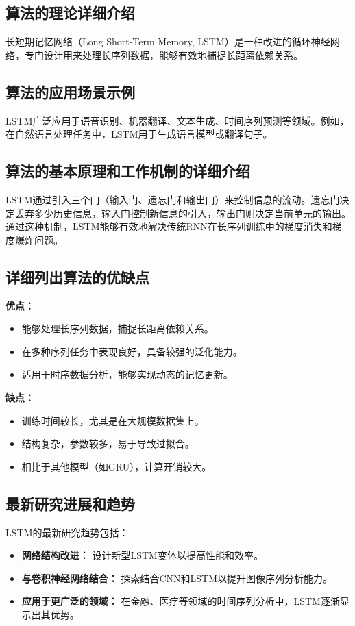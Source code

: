 \subsection*{算法的理论详细介绍}
长短期记忆网络（Long Short-Term Memory, LSTM）是一种改进的循环神经网络，专门设计用来处理长序列数据，能够有效地捕捉长距离依赖关系。

\subsection*{算法的应用场景示例}
LSTM广泛应用于语音识别、机器翻译、文本生成、时间序列预测等领域。例如，在自然语言处理任务中，LSTM用于生成语言模型或翻译句子。

\subsection*{算法的基本原理和工作机制的详细介绍}
LSTM通过引入三个门（输入门、遗忘门和输出门）来控制信息的流动。遗忘门决定丢弃多少历史信息，输入门控制新信息的引入，输出门则决定当前单元的输出。通过这种机制，LSTM能够有效地解决传统RNN在长序列训练中的梯度消失和梯度爆炸问题。

\subsection*{详细列出算法的优缺点}
\textbf{优点：}
\begin{itemize}
    \item 能够处理长序列数据，捕捉长距离依赖关系。
    \item 在多种序列任务中表现良好，具备较强的泛化能力。
    \item 适用于时序数据分析，能够实现动态的记忆更新。
\end{itemize}

\textbf{缺点：}
\begin{itemize}
    \item 训练时间较长，尤其是在大规模数据集上。
    \item 结构复杂，参数较多，易于导致过拟合。
    \item 相比于其他模型（如GRU），计算开销较大。
\end{itemize}

\subsection*{最新研究进展和趋势}
LSTM的最新研究趋势包括：
\begin{itemize}
    \item \textbf{网络结构改进：} 设计新型LSTM变体以提高性能和效率。
    \item \textbf{与卷积神经网络结合：} 探索结合CNN和LSTM以提升图像序列分析能力。
    \item \textbf{应用于更广泛的领域：} 在金融、医疗等领域的时间序列分析中，LSTM逐渐显示出其优势。
\end{itemize}
